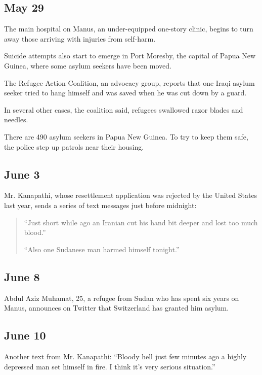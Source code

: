 \hypertarget{may-29}{%
\subsection{May 29}\label{may-29}}

The main hospital on Manus, an under-equipped one-story clinic, begins
to turn away those arriving with injuries from self-harm.

Suicide attempts also start to emerge in Port Moresby, the capital of
Papua New Guinea, where some asylum seekers have been moved.

The Refugee Action Coalition, an advocacy group, reports that one Iraqi
asylum seeker tried to hang himself and was saved when he was cut down
by a guard.

In several other cases, the coalition said, refugees swallowed razor
blades and needles.

There are 490 asylum seekers in Papua New Guinea. To try to keep them
safe, the police step up patrols near their housing.

\hypertarget{june-3}{%
\subsection{June 3}\label{june-3}}

Mr. Kanapathi, whose resettlement application was rejected by the United
States last year, sends a series of text messages just before midnight:

\begin{quote}
``Just short while ago an Iranian cut his hand bit deeper and lost too
much blood.''

``Also one Sudanese man harmed himself tonight.''
\end{quote}

\hypertarget{june-8}{%
\subsection{June 8}\label{june-8}}

Abdul Aziz Muhamat, 25, a refugee from Sudan who has spent six years on
Manus, announces on Twitter that Switzerland has granted him asylum.

\hypertarget{june-10}{%
\subsection{June 10}\label{june-10}}

Another text from Mr. Kanapathi: ``Bloody hell just few minutes ago a
highly depressed man set himself in fire. I think it's very serious
situation.''

